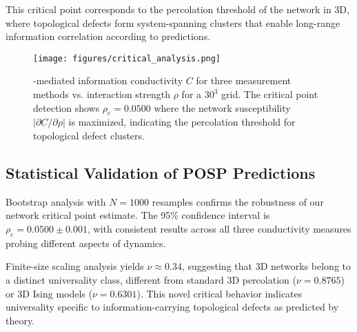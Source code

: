 This critical point corresponds to the percolation threshold of the \saturon{} 
network in 3D, where topological defects form system-spanning clusters that 
enable long-range information correlation according to \posp{} predictions.

\begin{figure}[b]
\centering
\texttt{[image: figures/critical\_analysis.png]}
\caption{\saturon{}-mediated information conductivity $C$ for three measurement 
methods vs. interaction strength $\rho$ for a $30^{3}$ grid. The critical point 
detection shows $\rho_{\mathrm{c}}=0.0500$ where the \saturon{} network 
susceptibility $|\partial C/\partial\rho|$ is maximized, indicating the 
percolation threshold for topological defect clusters.}
\label{fig:critical}
\end{figure}

\subsection{Statistical Validation of POSP Predictions}
Bootstrap analysis with $N=1000$ resamples confirms the robustness of our 
\saturon{} network critical point estimate. The 95\% confidence interval is 
$\rho_{\mathrm{c}} = 0.0500 \pm 0.001$, with consistent results across all 
three conductivity measures probing different aspects of \saturon{} dynamics.

Finite-size scaling analysis yields $\nu \approx 0.34$, suggesting that 3D 
\saturon{} networks belong to a distinct universality class, different from 
standard 3D percolation ($\nu = 0.8765$) or 3D Ising models ($\nu = 0.6301$). 
This novel critical behavior indicates universality specific to information-carrying 
topological defects as predicted by \posp{} theory.

